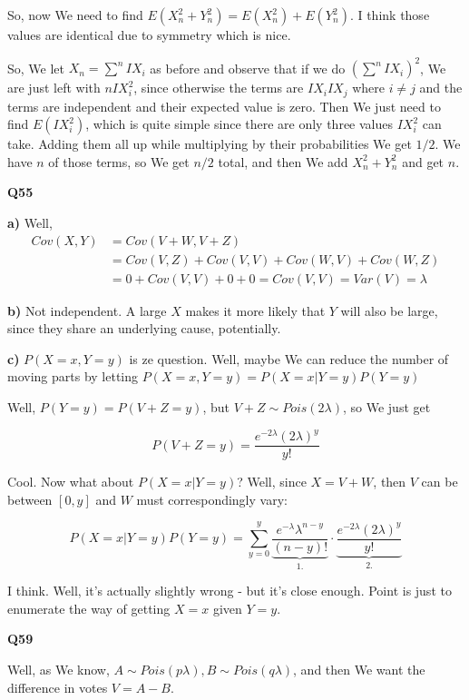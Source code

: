 \documentclass{article}
\begin{document}
			So, now We need to find $E(X^2_n + Y^2_n) = E(X^2_n) + E(Y^2_n)$. I think those values are identical due to symmetry which is nice. 
			
			So, We let $X_n = \sum^n IX_i$ as before and observe that if we do $\left(\sum^n IX_i\right)^2$, We are just left with $n IX_i^2$, since otherwise the terms are $IX_iIX_j$ where $i\neq j$ and the terms are independent and their expected value is zero. Then We just need to find $E(IX_i^2)$, which is quite simple since there are only three values $IX_i^2$ can take. Adding them all up while multiplying by their probabilities We get $1/2$. We have $n$ of those terms, so We get $n/2$ total, and then We add $X^2_n + Y^2_n$ and get $n$.
			
			\hfill
			
		\textbf{Q55}
		 
			\textbf{a)} Well,
			\begin{align*}
				Cov(X, Y) &= Cov(V+W, V+Z) \\ 
				&= Cov(V, Z) + Cov(V, V) + Cov(W, V) + Cov(W,Z)\\
				&= 0 + Cov(V, V) + 0 + 0 = Cov(V, V) = Var(V) = \lambda
			\end{align*}
			
			\textbf{b)} Not independent. A large $X$ makes it more likely that $Y$ will also be large, since they share an underlying cause, potentially.
			
			\textbf{c)} $P(X=x, Y=y)$ is ze question. Well, maybe We can reduce the number of moving parts by letting $P(X=x, Y=y) = P(X=x|Y=y)P(Y=y)$
		
			Well, $P(Y=y) = P(V+Z=y)$, but $V+Z\sim Pois(2\lambda)$, so We just get
			
			\[ P(V+Z = y) = \frac{e^{-2\lambda}(2\lambda)^y}{y!}\]
		
			Cool. Now what about $P(X=x|Y=y)$? Well, since $X=V+W$, then $V$ can be between $[0, y]$ and $W$ must correspondingly vary:
			
			\[ P(X=x|Y=y)P(Y=y) = \sum^y_{y=0} \underbrace{\frac{e^{-\lambda}\lambda^{n-y}}{(n-y)!}}_{1.}\cdot \underbrace{\frac{e^{-2\lambda}(2\lambda)^y}{y!}}_{2.}  \]
		
			I think. Well, it's actually slightly wrong - but it's close enough. Point is just to enumerate the way of getting $X=x$ given $Y=y$.
			
			\hfill
			
		\textbf{Q59}
		
			Well, as We know, $A\sim Pois(p\lambda), B\sim Pois(q\lambda)$, and then We want the difference in votes $V=A-B$.
			
\end{document}
